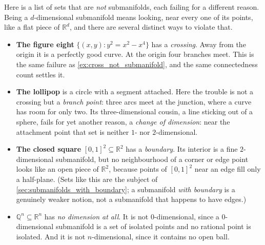 Here is a list of sets that are \emph{not} submanifolds, each failing for a different reason.
Being a $d$-dimensional
submanifold means looking, near every one of its points, like a flat piece of $\mathbb{R}^d$, and
there are several distinct ways to violate that.

\begin{itemize}
  \item \textbf{The figure eight} $\{(x,y) : y^2 = x^2 - x^4\}$ has a \emph{crossing}. Away from
    the origin it is a perfectly good curve. At the origin four branches meet. This is the same
    failure as \cref{ex:cross_not_submanifold}, and the same connectedness count settles it.
  \item \textbf{The lollipop} is a circle with a segment attached. Here the trouble is not a
    crossing but a \emph{branch point}: three arcs meet at the junction, where a curve has room
    for only two. Its three-dimensional cousin, a line sticking out of a sphere, fails for yet
    another reason, a \emph{change of dimension}: near the attachment point that set is neither
    $1$- nor $2$-dimensional.
  \item \textbf{The closed square} $[0,1]^2 \subseteq \mathbb{R}^2$ has a \emph{boundary}. Its
    interior is a fine $2$-dimensional submanifold, but no neighbourhood of a corner or edge
    point looks like an open piece of $\mathbb{R}^2$, because points of $[0,1]^2$ near an edge
    fill only a half-plane. (Sets like this are the subject of
    \cref{sec:submanifolds_with_boundary}; a submanifold \emph{with boundary} is a genuinely
    weaker notion, not a submanifold that happens to have edges.)
  \item \textbf{$\mathbb{Q}^n \subseteq \mathbb{R}^n$} has \emph{no dimension at all}. It is not
    $0$-dimensional, since a $0$-dimensional submanifold is a set of isolated points and no
    rational point is isolated. And it is not $n$-dimensional, since it contains no open ball.
\end{itemize}

